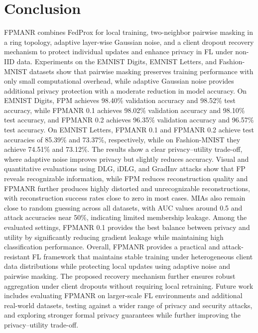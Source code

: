 \documentclass[a4paper,fleqn]{cas-dc}
\begin{document}
\section{Conclusion}
\label{sec:7}

FPMANR combines FedProx for local training, two-neighbor pairwise masking in a ring topology, adaptive layer-wise Gaussian noise, and a client dropout recovery mechanism to protect individual updates and enhance privacy in FL under non-IID data. Experiments on the EMNIST Digits, EMNIST Letters, and Fashion-MNIST datasets show that pairwise masking preserves training performance with only small computational overhead, while adaptive Gaussian noise provides additional privacy protection with a moderate reduction in model accuracy. On EMNIST Digits, FPM achieves 98.40\% validation accuracy and 98.52\% test accuracy, while FPMANR 0.1 achieves 98.02\% validation accuracy and 98.10\% test accuracy, and FPMANR 0.2 achieves 96.35\% validation accuracy and 96.57\% test accuracy. On EMNIST Letters, FPMANR 0.1 and FPMANR 0.2 achieve test accuracies of 85.39\% and 73.37\%, respectively, while on Fashion-MNIST they achieve 74.51\% and 73.12\%. The results show a clear privacy--utility trade-off, where adaptive noise improves privacy but slightly reduces accuracy. Visual and quantitative evaluations using DLG, iDLG, and GradInv attacks show that FP reveals recognizable information, while FPM reduces reconstruction quality and FPMANR further produces highly distorted and unrecognizable reconstructions, with reconstruction success rates close to zero in most cases. MIAs also remain close to random guessing across all datasets, with AUC values around 0.5 and attack accuracies near 50\%, indicating limited membership leakage. Among the evaluated settings, FPMANR 0.1 provides the best balance between privacy and utility by significantly reducing gradient leakage while maintaining high classification performance. Overall, FPMANR provides a practical and attack-resistant FL framework that maintains stable training under heterogeneous client data distributions while protecting local updates using adaptive noise and pairwise masking. The proposed recovery mechanism further ensures robust aggregation under client dropouts without requiring local retraining. Future work includes evaluating FPMANR on larger-scale FL environments and additional real-world datasets, testing against a wider range of privacy and security attacks, and exploring stronger formal privacy guarantees while further improving the privacy--utility trade-off.



\end{document}
